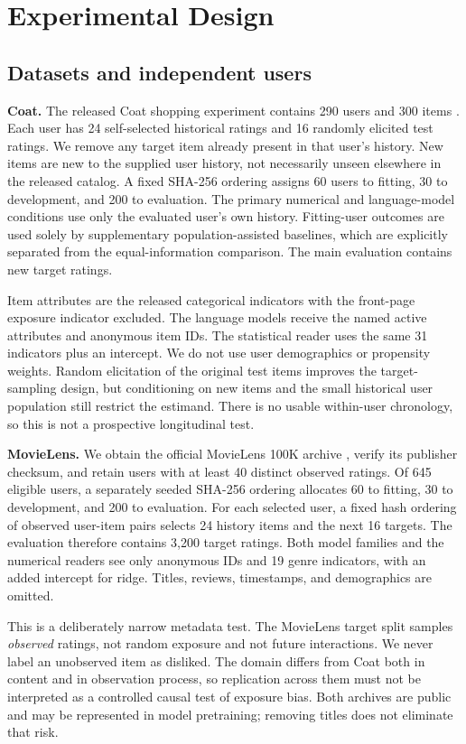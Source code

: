 \documentclass{article}
\begin{document}
\section{Experimental Design}
\subsection{Datasets and independent users}
\textbf{Coat.} The released Coat shopping experiment contains 290 users and 300 items \citep{schnabel2016recommendations}. Each user has 24 self-selected historical ratings and 16 randomly elicited test ratings. We remove any target item already present in that user's history. New items are new to the supplied user history, not necessarily unseen elsewhere in the released catalog. A fixed SHA-256 ordering assigns 60 users to fitting, 30 to development, and 200 to evaluation. The primary numerical and language-model conditions use only the evaluated user's own history. Fitting-user outcomes are used solely by supplementary population-assisted baselines, which are explicitly separated from the equal-information comparison. The main evaluation contains \CoatTargets{} new target ratings.

Item attributes are the released categorical indicators with the front-page exposure indicator excluded. The language models receive the named active attributes and anonymous item IDs. The statistical reader uses the same 31 indicators plus an intercept. We do not use user demographics or propensity weights. Random elicitation of the original test items improves the target-sampling design, but conditioning on new items and the small historical user population still restrict the estimand. There is no usable within-user chronology, so this is not a prospective longitudinal test.

\textbf{MovieLens.} We obtain the official MovieLens 100K archive \citep{harper2015movielens}, verify its publisher checksum, and retain users with at least 40 distinct observed ratings. Of 645 eligible users, a separately seeded SHA-256 ordering allocates 60 to fitting, 30 to development, and 200 to evaluation. For each selected user, a fixed hash ordering of observed user-item pairs selects 24 history items and the next 16 targets. The evaluation therefore contains 3,200 target ratings. Both model families and the numerical readers see only anonymous IDs and 19 genre indicators, with an added intercept for ridge. Titles, reviews, timestamps, and demographics are omitted.

This is a deliberately narrow metadata test. The MovieLens target split samples \emph{observed} ratings, not random exposure and not future interactions. We never label an unobserved item as disliked. The domain differs from Coat both in content and in observation process, so replication across them must not be interpreted as a controlled causal test of exposure bias. Both archives are public and may be represented in model pretraining; removing titles does not eliminate that risk.
\end{document}
